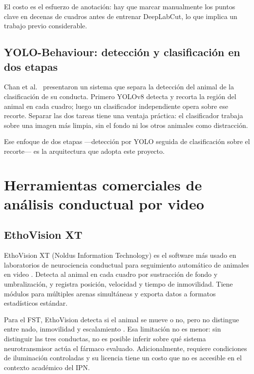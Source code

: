 El costo es el esfuerzo de anotación: hay que marcar manualmente los puntos clave en
decenas de cuadros antes de entrenar DeepLabCut, lo que implica un trabajo previo
considerable.

\subsection{YOLO-Behaviour: detección y clasificación en dos etapas}

Chan et al.\ \cite{chan2025_yolo} presentaron un sistema que separa la detección del
animal de la clasificación de su conducta. Primero YOLOv8 detecta y recorta la región
del animal en cada cuadro; luego un clasificador independiente opera sobre ese recorte.
Separar las dos tareas tiene una ventaja práctica: el clasificador trabaja sobre una
imagen más limpia, sin el fondo ni los otros animales como distracción.

Ese enfoque de dos etapas ---detección por YOLO seguida de clasificación sobre el
recorte--- es la arquitectura que adopta este proyecto.

\section{Herramientas comerciales de análisis conductual por video}

\subsection{EthoVision XT}

EthoVision XT (Noldus Information Technology) es el software más usado en laboratorios
de neurociencia conductual para seguimiento automático de animales en video
\cite{noldus_ethovision}. Detecta al animal en cada cuadro por sustracción de fondo y
umbralización, y registra posición, velocidad y tiempo de inmovilidad. Tiene módulos
para múltiples arenas simultáneas y exporta datos a formatos estadísticos estándar.

Para el FST, EthoVision detecta si el animal se mueve o no, pero no distingue entre
nado, inmovilidad y escalamiento \cite{della_valle2025}. Esa limitación no es menor:
sin distinguir las tres conductas, no es posible inferir sobre qué sistema
neurotransmisor actúa el fármaco evaluado. Adicionalmente, requiere condiciones de
iluminación controladas y su licencia tiene un costo que no es accesible en el contexto
académico del IPN.


